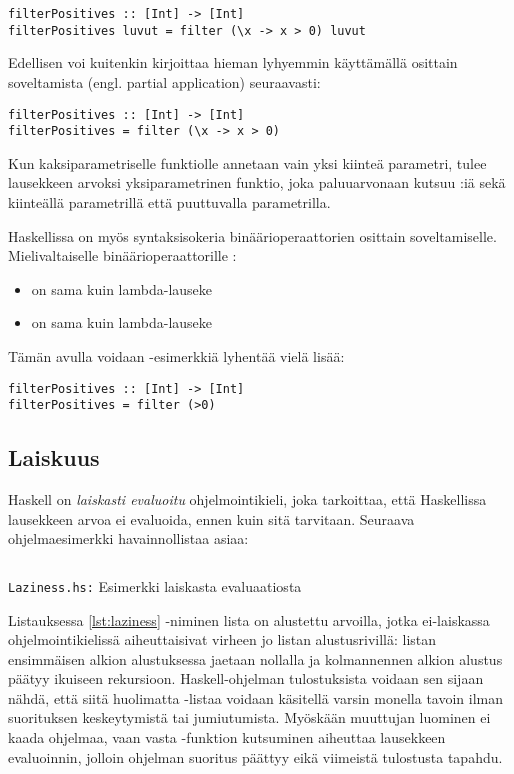 \begin{verbatim}
filterPositives :: [Int] -> [Int]
filterPositives luvut = filter (\x -> x > 0) luvut
\end{verbatim}

Edellisen voi kuitenkin kirjoittaa hieman lyhyemmin käyttämällä osittain soveltamista
(engl. partial application) seuraavasti:

\begin{verbatim}
filterPositives :: [Int] -> [Int]
filterPositives = filter (\x -> x > 0)
\end{verbatim}

Kun kaksiparametriselle funktiolle  annetaan vain yksi kiinteä parametri,
tulee lausekkeen arvoksi yksiparametrinen funktio,
joka paluuarvonaan kutsuu :iä sekä kiinteällä parametrillä että puuttuvalla parametrilla.

Haskellissa on myös syntaksisokeria binäärioperaattorien osittain soveltamiselle.
Mielivaltaiselle binäärioperaattorille :
\begin{itemize}
    \item {} on sama kuin lambda-lauseke 
    \item {} on sama kuin lambda-lauseke 
\end{itemize}

Tämän avulla voidaan -esimerkkiä lyhentää vielä lisää:
\begin{verbatim}
filterPositives :: [Int] -> [Int]
filterPositives = filter (>0)
\end{verbatim}
\fi

\subsection{Laiskuus}

Haskell on \emph{laiskasti evaluoitu} ohjelmointikieli,
joka tarkoittaa,
että Haskellissa lausekkeen arvoa ei evaluoida,
ennen kuin sitä tarvitaan.
Seuraava ohjelmaesimerkki havainnollistaa asiaa:

\begin{listing}[H]
    \inputminted{haskell}{codes/Laziness.hs}
    \label{lst:laziness}
    \caption{\texttt{Laziness.hs:} Esimerkki laiskasta evaluaatiosta}
\end{listing}

Listauksessa \ref{lst:laziness} -niminen lista on alustettu arvoilla,
jotka ei-laiskassa ohjelmointikielissä aiheuttaisivat virheen jo listan alustusrivillä:
listan ensimmäisen alkion alustuksessa jaetaan nollalla ja kolmannennen alkion
alustus päätyy ikuiseen rekursioon.
Haskell-ohjelman tulostuksista voidaan sen sijaan nähdä,
että siitä huolimatta -listaa voidaan käsitellä varsin monella
tavoin ilman suorituksen keskeytymistä tai jumiutumista.
Myöskään muuttujan  luominen ei kaada ohjelmaa,
vaan vasta -funktion kutsuminen aiheuttaa lausekkeen
 evaluoinnin, jolloin ohjelman suoritus päättyy
eikä viimeistä tulostusta tapahdu.

